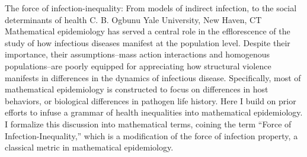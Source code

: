 
    \begin{abstract_online}{The force of infection-inequality: From models of indirect infection, to the social determinants of health}{%
        C. B. Ogbunu}{%
        }{%
        Yale University, New Haven, CT}
    Mathematical epidemiology has served a central role in the efflorescence of the study of how infectious diseases manifest at the population level. Despite their importance, their assumptions–mass action interactions and homogenous populations–are poorly equipped for appreciating how structural violence manifests in differences in the dynamics of infectious disease. Specifically, most of mathematical epidemiology is constructed to focus on differences in host behaviors, or biological differences in pathogen life history. Here I build on prior efforts to infuse a grammar of health inequalities into mathematical epidemiology. I formalize this discussion into mathematical terms, coining the term “Force of Infection-Inequality,” which is a modification of the force of infection property, a classical metric in mathematical epidemiology. 
    
    \end{abstract_online}
    